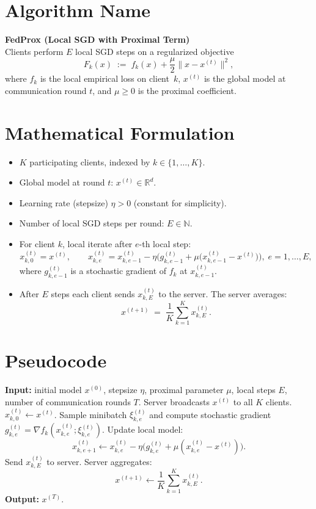 \documentclass[11pt]{article}
\newcommand{\R}{\mathbb{R}}
\begin{document}
\section*{Algorithm Name}
\textbf{FedProx (Local SGD with Proximal Term)}\\
Clients perform $E$ local SGD steps on a regularized objective 
\[
F_k(x) \;:=\; f_k(x) + \frac{\mu}{2}\|x-x^{(t)}\|^{2},
\]
where $f_k$ is the local empirical loss on client~$k$, $x^{(t)}$ is the global model at communication round $t$, and $\mu\ge 0$ is the proximal coefficient.

\section*{Mathematical Formulation}
\begin{itemize}
\item $K$ participating clients, indexed by $k\in\{1,\dots,K\}$.
\item Global model at round $t$: $x^{(t)}\in\R^{d}$.
\item Learning rate (stepsize) $\eta>0$ (constant for simplicity).
\item Number of local SGD steps per round: $E\in\mathbb N$.
\item For client $k$, local iterate after $e$-th local step:
\[
x^{(t)}_{k,0}=x^{(t)},\qquad
x^{(t)}_{k,e}=x^{(t)}_{k,e-1}-\eta\bigl(g^{(t)}_{k,e-1}
      +\mu\bigl(x^{(t)}_{k,e-1}-x^{(t)}\bigr)\bigr),\; e=1,\dots,E,
\]
where $g^{(t)}_{k,e-1}$ is a stochastic gradient of $f_k$ at $x^{(t)}_{k,e-1}$.
\item After $E$ steps each client sends $x^{(t)}_{k,E}$ to the server. The server averages:
\[
x^{(t+1)} \;=\;\frac{1}{K}\sum_{k=1}^{K}x^{(t)}_{k,E}.
\]
\end{itemize}

\section*{Pseudocode}
\begin{algorithm}[H]
\caption{FedProx}
\begin{algorithmic}[1]
\STATE \textbf{Input:} initial model $x^{(0)}$, stepsize $\eta$, proximal parameter $\mu$, local steps $E$, number of communication rounds $T$.
    \STATE Server broadcasts $x^{(t)}$ to all $K$ clients.
        \STATE $x^{(t)}_{k,0}\leftarrow x^{(t)}$.
            \STATE Sample minibatch $\xi^{(t)}_{k,e}$ and compute stochastic gradient 
            $g^{(t)}_{k,e}=\nabla f_k(x^{(t)}_{k,e};\xi^{(t)}_{k,e})$.
            \STATE Update local model:
            \[
            x^{(t)}_{k,e+1}\leftarrow x^{(t)}_{k,e}
            -\eta\bigl(g^{(t)}_{k,e}+\mu(x^{(t)}_{k,e}-x^{(t)})\bigr).
            \]
        \ENDFOR
        \STATE Send $x^{(t)}_{k,E}$ to server.
    \ENDFOR
    \STATE Server aggregates:
    \[
    x^{(t+1)}\leftarrow\frac{1}{K}\sum_{k=1}^{K}x^{(t)}_{k,E}.
    \]
\ENDFOR
\STATE \textbf{Output:} $x^{(T)}$.
\end{algorithmic}
\end{algorithm}
\end{document}
